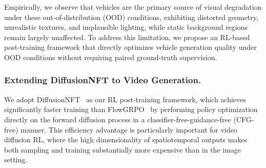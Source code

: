 \documentclass[runningheads]{llncs}
\begin{document}

Empirically, we observe that vehicles are the primary source of visual degradation under these out-of-distribution (OOD) conditions, exhibiting distorted geometry, unrealistic textures, and implausible lighting, while static background regions remain largely unaffected. To address this limitation, we propose an RL-based post-training framework that directly optimizes vehicle generation quality under OOD conditions without requiring paired ground-truth supervision.


\subsubsection{Extending DiffusionNFT to Video Generation.}

We adopt DiffusionNFT~\cite{zheng2025diffusionnft} as our RL post-training framework, which achieves significantly faster training than FlowGRPO~\cite{liu2025flow} by performing policy optimization directly on the forward diffusion process in a classifier-free-guidance-free (CFG-free) manner. This efficiency advantage is particularly important for video diffusion RL, where the high dimensionality of spatiotemporal outputs makes both sampling and training substantially more expensive than in the image setting.
\end{document}
